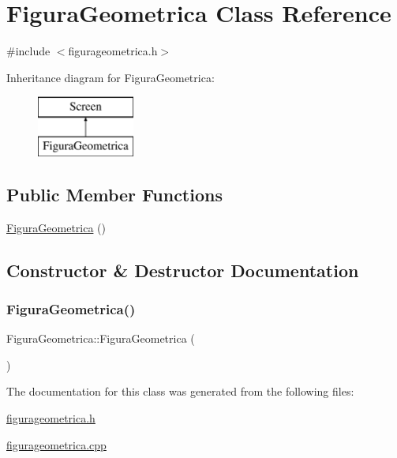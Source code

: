 \hypertarget{class_figura_geometrica}{}\section{Figura\+Geometrica Class Reference}
\label{class_figura_geometrica}


{\ttfamily \#include $<$figurageometrica.\+h$>$}

Inheritance diagram for Figura\+Geometrica\+:\begin{figure}[H]
\begin{center}
\leavevmode
\includegraphics[height=2.000000cm]{class_figura_geometrica}
\end{center}
\end{figure}
\subsection*{Public Member Functions}
\begin{DoxyCompactItemize}
\item 
\mbox{\hyperlink{class_figura_geometrica_a81d7c7efaea511e60a15f5a363138dd9}{Figura\+Geometrica}} ()
\end{DoxyCompactItemize}


\subsection{Constructor \& Destructor Documentation}
\mbox{\label{class_figura_geometrica_a81d7c7efaea511e60a15f5a363138dd9}} 
\subsubsection{\texorpdfstring{Figura\+Geometrica()}{FiguraGeometrica()}}
{\footnotesize\ttfamily Figura\+Geometrica\+::\+Figura\+Geometrica (\begin{DoxyParamCaption}{ }\end{DoxyParamCaption})}



The documentation for this class was generated from the following files\+:\begin{DoxyCompactItemize}
\item 
\mbox{\hyperlink{figurageometrica_8h}{figurageometrica.\+h}}\item 
\mbox{\hyperlink{figurageometrica_8cpp}{figurageometrica.\+cpp}}\end{DoxyCompactItemize}
